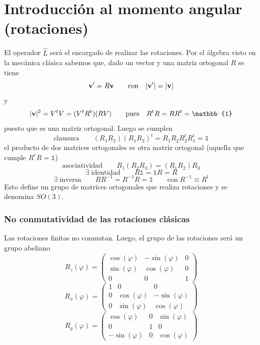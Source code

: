 \documentclass[10pt,oneside]{CBFT_book}
\begin{document}
\chapter{Introducción al momento angular (rotaciones)}

El operador $\hat{L}$ será el encargado de realizar las rotaciones. Por el álgebra visto en la mecánica 
clásica sabemos que, dado un vector  y una matriz ortogonal $R$ se tiene
\[
	\vb{v}' = R \vb{v} \qquad \text{con} \quad |\vb{v}'|=|\vb{v}|
\]
y 
\[
	|\vb{v}|^2 = V^t V = (V^t R^t) (R V) \qquad \text{pues} \quad R^tR=RR^t = \mathbb{1}
\]
puesto que es una matriz ortogonal. Luego se cumplen 
\[
	\text{clausura}	 \qquad (R_1R_2)(R_1R_2)^t = R_1R_2R_2^tR_1^t = \mathbb{1}
\]
el producto de dos matrices ortogonales es otra matriz ortogonal (aquella que cumple $R^rR=\mathbb{1}$)
\[
	\text{asociatividad} \qquad R_1(R_2R_3) = (R_1R_2)R_3
\]
\[
	\exists \; \text{identidad} \qquad R\mathbb{1} = \mathbb{1}R = R
\]
\[
	\exists \; \text{inversa} \qquad RR^{-1} = R^{-1}R = \mathbb{1} \qquad \text{con}\; R^{-1}\equiv R^t
\]
Esto define un grupo de matrices ortogonales que realiza rotaciones y se denomina $SO(3)$.

\subsection{No conmutatividad de las rotaciones clásicas}

Las rotaciones finitas no conmutan. Luego, el grupo de las rotaciones será un grupo abeliano
\[
	R_z(\varphi) = \begin{pmatrix}
	\cos(\varphi) & -\sin(\varphi) & 0 \\
	\sin(\varphi) & \cos(\varphi) & 0 \\
	0 & 0 & 1
	\end{pmatrix}
\]
\[
	R_x(\varphi) = \begin{pmatrix}
	1 & 0 & 0 \\
	0 & \cos(\varphi) & -\sin(\varphi) \\
	0 & \sin(\varphi) & \cos(\varphi)
	\end{pmatrix}
\]
\[
	R_y(\varphi) = \begin{pmatrix}
	\cos(\varphi) & 0 & \sin(\varphi) \\
	0 & 1 & 0 \\
	-\sin(\varphi) & 0 & \cos(\varphi)
	\end{pmatrix}
\]
\end{document}
